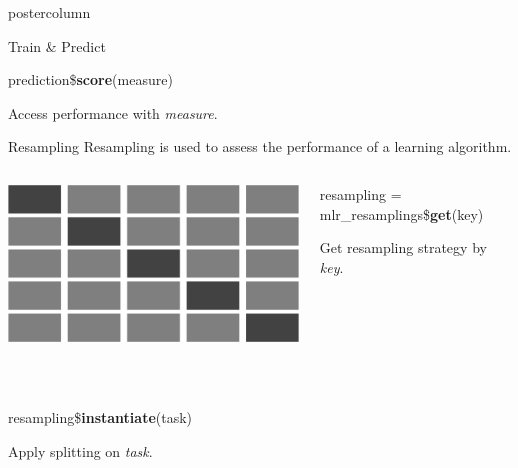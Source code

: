 \documentclass{beamer}
\begin{document}
\begin{frame}[fragile]{}
\begin{columns}
\begin{column}{.31\textwidth}
\begin{beamercolorbox}[center]{postercolumn}
\begin{minipage}{.98\textwidth}
{\begin{myblock}{Train \& Predict}
						\\
						\begin{codebox}
							prediction\$\textbf{score}(measure)
						\end{codebox}
						\hspace*{1ex}Access performance with \textit{measure}.
					\end{myblock}
					\begin{myblock}{Resampling}
						Resampling is used to assess the performance of a learning algorithm.
						\\[\baselineskip]
						\begin{minipage}{\textwidth}
							\begin{columns}[T]
								\begin{column}{0.2\textwidth}
									\includegraphics[width=\textwidth]{img/cross_validation.png}
								\end{column}
								\begin{column}{0.8\textwidth}
										\begin{codebox}
										resampling = mlr\_resamplings\$\textbf{get}(key)
										\end{codebox}
										\hspace*{1ex}Get resampling strategy by \textit{key}. 
								\end{column}
							\end{columns}
						\end{minipage}
						\\[\baselineskip]
						\begin{codebox}
							resampling\$\textbf{instantiate}(task)
						\end{codebox}
						\hspace*{1ex}Apply splitting on \textit{task}.
						\\
						\begin{codebox}

\end{codebox}
\end{myblock}}
\end{minipage}
\end{beamercolorbox}
\end{column}
\end{columns}
\end{frame}
\end{document}
